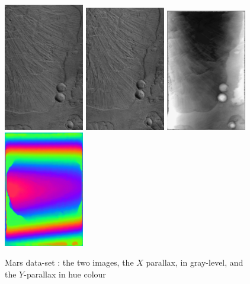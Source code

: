 \begin{figure}
\begin{center}
\includegraphics[width=35mm]{FIGS/Mars/SmaIm1.jpg}
\includegraphics[width=35mm]{FIGS/Mars/SmIm2.jpg}
\includegraphics[width=35mm]{FIGS/Mars/Px1.jpg}
\includegraphics[width=35mm]{FIGS/Mars/Px2.jpg}

\end{center}
\caption{Mars data-set : the two  images, the $X$ parallax, in gray-level, and the $Y$-parallax in
hue colour}
\label{FIG:OK:Mars}
\end{figure}



